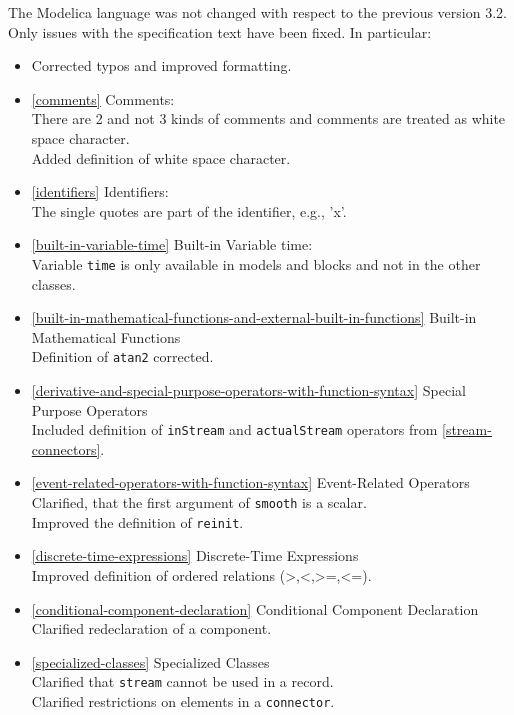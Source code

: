The Modelica language was not changed with respect to the previous
version 3.2. Only issues with the specification text have been fixed. In
particular:
\begin{itemize}
\item
  Corrected typos and improved formatting.
\item
  \cref{comments} Comments:\\
  There are 2 and not 3 kinds of comments and comments are treated as
  white space character.\\
  Added definition of white space character.
\item
  \cref{identifiers} Identifiers:\\
  The single quotes are part of the identifier, e.g., 'x'.
\item
  \cref{built-in-variable-time} Built-in Variable time:\\
  Variable \lstinline!time! is only available in models and blocks and not in the
  other classes.
\item
  \cref{built-in-mathematical-functions-and-external-built-in-functions} Built-in Mathematical Functions\\
  Definition of \lstinline!atan2! corrected.
\item
  \cref{derivative-and-special-purpose-operators-with-function-syntax} Special Purpose Operators\\
  Included definition of \lstinline!inStream! and \lstinline!actualStream! operators from \cref{stream-connectors}.
\item
  \cref{event-related-operators-with-function-syntax} Event-Related Operators\\
  Clarified, that the first argument of \lstinline!smooth! is a scalar.\\
  Improved the definition of \lstinline!reinit!.
\item
  \cref{discrete-time-expressions} Discrete-Time Expressions\\
  Improved definition of ordered relations
  (\textgreater{},\textless{},\textgreater{}=,\textless{}=).
\item
  \cref{conditional-component-declaration} Conditional Component Declaration\\
  Clarified redeclaration of a component.
\item
  \cref{specialized-classes} Specialized Classes\\
  Clarified that \lstinline!stream! cannot be used in a record.\\
  Clarified restrictions on elements in a \lstinline!connector!.\\

\end{itemize}
